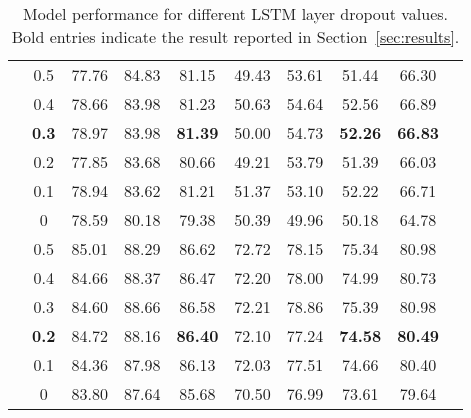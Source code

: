 \documentclass[review]{elsarticle}
\newcommand{\secref}[1]{Section~\ref{#1}}
\begin{document}
\begin{table}[htp]
{\begin{tabular}{@{\extracolsep{4pt}}cccccccccc@{}}
&0.5&77.76  &84.83 &81.15  & 49.43&53.61& 51.44 & 66.30 \\
&0.4 & 78.66 & 83.98 &81.23 & 50.63 & 54.64 & 52.56 & 66.89\\
&\textbf{0.3}  &78.97&  83.98       &\textbf{81.39}     &50.00&54.73&\textbf{52.26}& \textbf{66.83 } \\
&0.2&77.85 &83.68 & 80.66  & 49.21& 53.79 & 51.39 & 66.03  \\
& 0.1& 78.94 & 83.62 &81.21 & 51.37 & 53.10 & 52.22& 66.71\\  
& 0&  78.59 & 80.18 & 79.38 & 50.39 &49.96 & 50.18 &64.78
\\
 \midrule
\parbox[c]{5mm}{}

&0.5& 85.01  &88.29 &86.62 & 72.72  & 78.15    &75.34 &80.98
  \\
&0.4 &  84.66 & 88.37  & 86.47  & 72.20 & 78.00  & 74.99 &80.73
\\
&0.3  &84.60& 88.66  &86.58    &72.21 &78.86&75.39 & 80.98 \\
& \textbf{0.2}& 84.72 & 88.16  &\textbf{86.40}    &72.10 &77.24&\textbf{74.58} & \textbf{80.49} \\ 
& 0.1&84.36  &87.98 &86.13    &72.03 &77.51 & 74.66   & 80.40\\ 
& 0&  83.80 & 87.64  & 85.68   &70.50 &76.99  & 73.61  & 79.64\\






     
\bottomrule
\end{tabular}
 }
\caption{Model performance for different LSTM layer dropout values.
Bold entries indicate the  result reported in \secref{sec:results}.}
\label{tab:lstm_dropout}
 \end{table}
 
\end{document}
